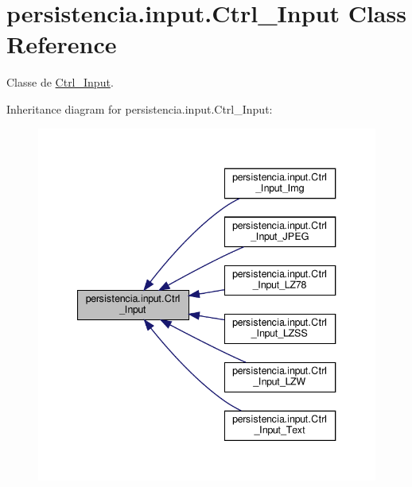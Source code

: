 \hypertarget{classpersistencia_1_1input_1_1Ctrl__Input}{}\section{persistencia.\+input.\+Ctrl\+\_\+\+Input Class Reference}
\label{classpersistencia_1_1input_1_1Ctrl__Input}


Classe de \hyperlink{classpersistencia_1_1input_1_1Ctrl__Input}{Ctrl\+\_\+\+Input}.  




Inheritance diagram for persistencia.\+input.\+Ctrl\+\_\+\+Input\+:\nopagebreak
\begin{figure}[H]
\begin{center}
\leavevmode
\includegraphics[width=340pt]{classpersistencia_1_1input_1_1Ctrl__Input__inherit__graph}
\end{center}
\end{figure}
